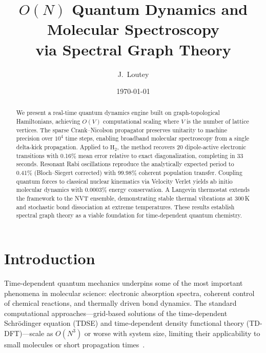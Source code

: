 \documentclass[aps,pra,twocolumn,superscriptaddress,longbibliography,floatfix]{revtex4-2}
\begin{document}
\title{$O(N)$ Quantum Dynamics and Molecular Spectroscopy\\
via Spectral Graph Theory}

\author{J.~Loutey}

\date{\today}

\begin{abstract}
We present a real-time quantum dynamics engine built on graph-topological
Hamiltonians, achieving $O(V)$ computational scaling where $V$ is the
number of lattice vertices. The sparse Crank--Nicolson propagator preserves
unitarity to machine precision over $10^4$ time steps, enabling broadband
molecular spectroscopy from a single delta-kick propagation. Applied to
$\mathrm{H}_2$, the method recovers 20 dipole-active electronic
transitions with 0.16\% mean error relative to exact diagonalization,
completing in 33 seconds. Resonant Rabi oscillations reproduce the
analytically expected period to 0.41\% (Bloch--Siegert corrected) with
99.98\% coherent population transfer. Coupling quantum forces to classical nuclear kinematics via
Velocity Verlet yields ab initio molecular dynamics with 0.0003\% energy
conservation. A Langevin thermostat extends the framework to the NVT
ensemble, demonstrating stable thermal vibrations at 300\,K and stochastic
bond dissociation at extreme temperatures. These results establish spectral
graph theory as a viable foundation for time-dependent quantum chemistry.
\end{abstract}

\maketitle

\section{Introduction}
\label{sec:introduction}

Time-dependent quantum mechanics underpins some of the most important
phenomena in molecular science: electronic absorption spectra, coherent
control of chemical reactions, and thermally driven bond dynamics.
The standard computational approaches---grid-based solutions of the
time-dependent Schr\"odinger equation (TDSE) and time-dependent density
functional theory (TD-DFT)---scale as $O(N^3)$ or worse with system
size, limiting their applicability to small molecules or short
propagation times~\cite{Marques2012,Li2020}.
\end{document}
